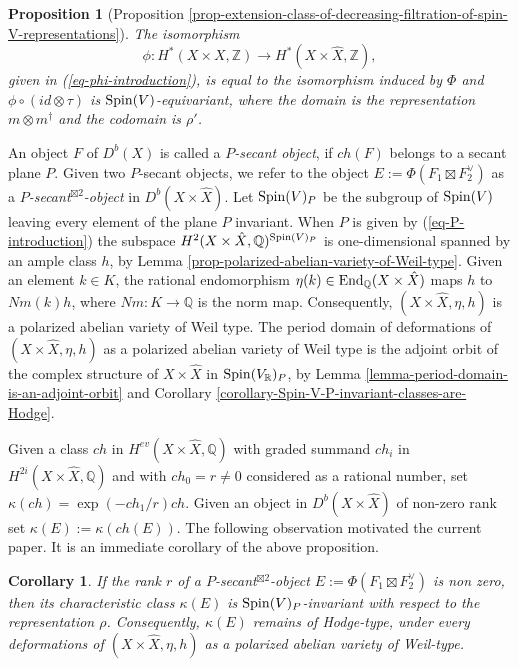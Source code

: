 \documentclass[12pt]{amsart}
\numberwithin{equation}{subsection}
\theoremstyle{plain}
\newtheorem{prop}[thm]{Proposition}
\newtheorem{cor}[thm]{Corollary}
\theoremstyle{definition}
\newcommand{\QQ}{{\mathbb Q}}
\newcommand{\RR}{{\mathbb R}}
\newcommand{\ZZ}{{\mathbb Z}}
\newcommand{\Spin}{{\rm Spin}}
\newcommand{\End}{{\rm End}}
\begin{document}
\begin{prop}[Proposition \ref{prop-extension-class-of-decreasing-filtration-of-spin-V-representations}]
The isomorphism 
\[
\phi:H^*(X\times X,\ZZ)\rightarrow H^*(X\times\hat{X},\ZZ),
\] 
given in (\ref{eq-phi-introduction}), is equal to the isomorphism  
induced by $\Phi$ and $\phi\circ(id\otimes \tau)$ is $\Spin(V)$-equivariant, where the domain is the representation $m\otimes m^\dagger$ and the codomain is $\rho'$.
\end{prop}


An object $F$ of $D^b(X)$ is called a {\em $P$-secant object}, if $ch(F)$ belongs to a secant plane $P$. Given two $P$-secant objects, we refer to the object $E:=\Phi(F_1\boxtimes F_2^\vee)$ as a {\em $P$-secant$^{\boxtimes 2}$-object} in $D^b(X\times\hat{X})$. Let $\Spin(V)_P$ be the subgroup  of $\Spin(V)$ leaving every element of the plane $P$ invariant. When $P$ is given by (\ref{eq-P-introduction})
the subspace $H^2(X\times\hat{X},\QQ)^{\Spin(V)_P}$ is one-dimensional spanned by an ample class $h$, by Lemma \ref{prop-polarized-abelian-variety-of-Weil-type}. Given an element $k\in K$, the rational endomorphism $\eta(k)\in \End_\QQ(X\times\hat{X})$ maps $h$ to $Nm(k)h$, where $Nm:K\rightarrow \QQ$ is the norm map. Consequently, $(X\times\hat{X},\eta,h)$ is a polarized abelian variety of Weil type. The period domain of deformations of $(X\times\hat{X},\eta,h)$ as a polarized abelian variety of Weil type is the adjoint orbit of the complex structure of $X\times\hat{X}$ in $\Spin(V_\RR)_P$, by Lemma \ref{lemma-period-domain-is-an-adjoint-orbit} and Corollary \ref{corollary-Spin-V-P-invariant-classes-are-Hodge}. 

Given a class $ch$ in $H^{ev}(X\times \hat{X},\QQ)$ with graded summand $ch_i$ in $H^{2i}(X\times \hat{X},\QQ)$ and with $ch_0=r\neq 0$
considered as a rational number, set $\kappa(ch)=\exp(-ch_1/r)ch$. Given an object in $D^b(X\times\hat{X})$
of non-zero rank set $\kappa(E):=\kappa(ch(E))$.
The following observation motivated the current paper. It is 
an immediate corollary of the above proposition.

\begin{cor}
\label{cor-kappa-class-is-Spin-V-P-invariant}
If the rank $r$ of a {\em $P$-secant$^{\boxtimes 2}$-object} $E:=\Phi(F_1\boxtimes F_2^\vee)$ is non zero, then its characteristic class
$
\kappa(E)
$
is $\Spin(V)_P$-invariant with respect to the representation $\rho$. Consequently, $\kappa(E)$ remains of Hodge-type, under every deformations of 
$(X\times\hat{X},\eta,h)$  as a polarized abelian variety of Weil-type.
\end{cor}
\end{document}
